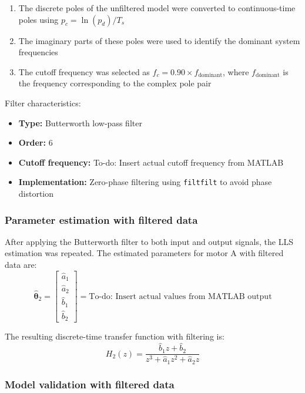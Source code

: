 \documentclass{article}
\begin{document}
	\begin{enumerate}
		\item The discrete poles of the unfiltered model were converted to continuous-time poles using $p_c = \ln(p_d)/T_s$
		\item The imaginary parts of these poles were used to identify the dominant system frequencies
		\item The cutoff frequency was selected as $f_c = 0.90 \times f_{\text{dominant}}$, where $f_{\text{dominant}}$ is the frequency corresponding to the complex pole pair
	\end{enumerate}
	
	Filter characteristics:
	\begin{itemize}
		\item \textbf{Type:} Butterworth low-pass filter
		\item \textbf{Order:} 6
		\item \textbf{Cutoff frequency:} To-do: Insert actual cutoff frequency from MATLAB
		\item \textbf{Implementation:} Zero-phase filtering using \texttt{filtfilt} to avoid phase distortion
	\end{itemize}
	
	\subsubsection{Parameter estimation with filtered data}
	
	After applying the Butterworth filter to both input and output signals, the LLS estimation was repeated. The estimated parameters for motor A with filtered data are:
	\begin{equation}
		\hat{\boldsymbol{\theta}}_2 = \begin{bmatrix} \hat{a}_1 \\ \hat{a}_2 \\ \hat{b}_1 \\ \hat{b}_2 \end{bmatrix} = \text{To-do: Insert actual values from MATLAB output}
	\end{equation}
	
	The resulting discrete-time transfer function with filtering is:
	\begin{equation}
		H_2(z) = \frac{\hat{b}_1 z + \hat{b}_2}{z^3 + \hat{a}_1 z^2 + \hat{a}_2 z}
	\end{equation}
	
	\subsubsection{Model validation with filtered data}
	
\end{document}
